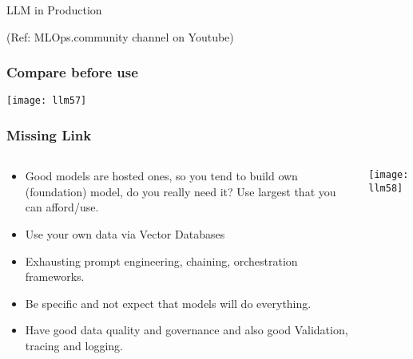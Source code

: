 \begin{frame}[fragile]\frametitle{}
\begin{center}
{\Large LLM in Production}

{\tiny (Ref: MLOps.community channel on Youtube)}

\end{center}
\end{frame}

\begin{frame}[fragile]\frametitle{Compare before use}

\begin{center}
\texttt{[image: llm57]}
\end{center}
\end{frame}

\begin{frame}[fragile]\frametitle{Missing Link}
\begin{columns}
    \begin{column}[T]{0.5\linewidth}
		\begin{itemize}
		\item Good models are hosted ones, so you tend to build own (foundation) model, do you really need it? Use largest that you can afford/use.
		\item Use your own data via Vector Databases
		\item Exhausting prompt engineering, chaining, orchestration frameworks.
		\item Be specific and not expect that models will do everything.
		\item Have good data quality and governance and also good Validation, tracing and logging.
		\end{itemize}	
    \end{column}
    \begin{column}[T]{0.5\linewidth}
		\begin{center}
			\texttt{[image: llm58]}
		\end{center}
	\end{column}
  \end{columns}
\end{frame}


